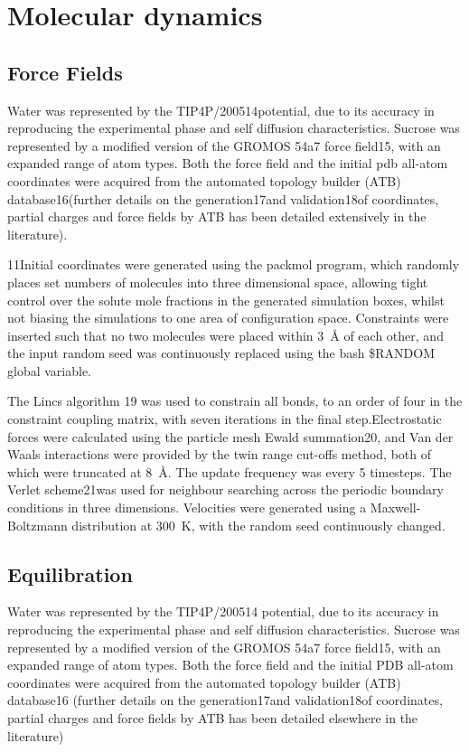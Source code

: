 \section{Molecular dynamics}
\subsection{Force Fields}
Water was represented by the TIP4P/200514potential, due to its accuracy in reproducing the experimental phase and self diffusion characteristics. Sucrose was represented by a modified version of the GROMOS 54a7 force field15, with an expanded range of atom types. Both the force field and the initial pdb all-atom coordinates were acquired from the automated topology builder (ATB) database16(further details on the generation17and validation18of coordinates, partial charges and force fields by ATB has been detailed extensively in the literature).

11Initial coordinates were generated using the packmol program, which randomly places set numbers of molecules into three dimensional space, allowing tight control over the solute mole fractions in the generated simulation boxes, whilst not biasing the simulations to one area of configuration space. Constraints were inserted such that no two molecules were placed within \SI{3}{\angstrom} of each other, and the input random seed was continuously replaced using the bash \$RANDOM global variable. 

The Lincs algorithm 19 was used to constrain all bonds, to an order of four in the constraint coupling matrix, with seven iterations in the final step.Electrostatic forces were calculated using the particle mesh Ewald summation20, and Van der Waals interactions were provided by the twin range cut-offs method, both of which were truncated at \SI{8}{\angstrom}. The update frequency was every 5 timesteps. The Verlet scheme21was used for neighbour searching across the periodic boundary conditions in three dimensions. Velocities were generated using a Maxwell-Boltzmann distribution at \SI{300}{\kelvin}, with the random seed continuously changed.

\subsection{Equilibration}
Water was represented by the TIP4P/200514 potential, due to its accuracy in reproducing the experimental phase and self diffusion characteristics. Sucrose was represented by a modified version of the GROMOS 54a7 force field15, with an expanded range of atom types. Both the force field and the initial PDB all-atom coordinates were acquired from the automated topology builder (ATB) database16 (further details on the generation17and validation18of coordinates, partial charges and force fields by ATB has been detailed elsewhere in the literature)

